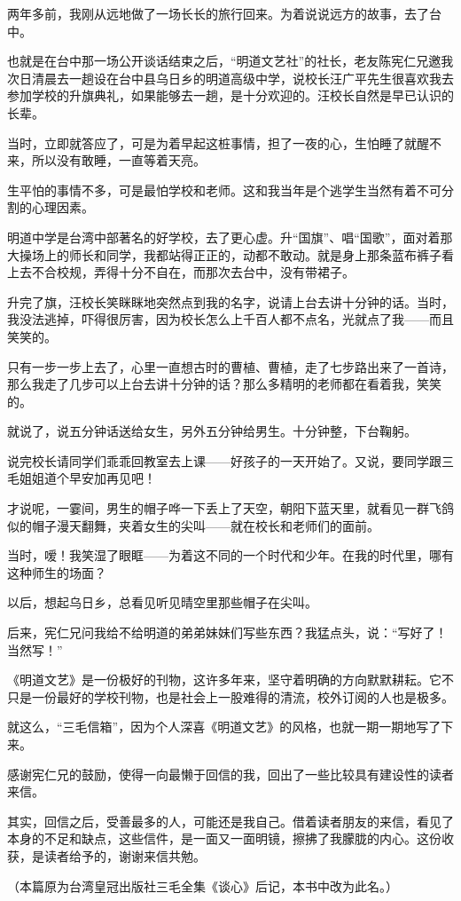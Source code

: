 \par 两年多前，我刚从远地做了一场长长的旅行回来。为着说说远方的故事，去了台中。
\par 也就是在台中那一场公开谈话结束之后，“明道文艺社”的社长，老友陈宪仁兄邀我次日清晨去一趟设在台中县乌日乡的明道高级中学，说校长汪广平先生很喜欢我去参加学校的升旗典礼，如果能够去一趟，是十分欢迎的。汪校长自然是早已认识的长辈。
\par 当时，立即就答应了，可是为着早起这桩事情，担了一夜的心，生怕睡了就醒不来，所以没有敢睡，一直等着天亮。
\par 生平怕的事情不多，可是最怕学校和老师。这和我当年是个逃学生当然有着不可分割的心理因素。
\par 明道中学是台湾中部著名的好学校，去了更心虚。升“国旗”、唱“国歌”，面对着那大操场上的师长和同学，我都站得正正的，动都不敢动。就是身上那条蓝布裤子看上去不合校规，弄得十分不自在，而那次去台中，没有带裙子。
\par 升完了旗，汪校长笑眯眯地突然点到我的名字，说请上台去讲十分钟的话。当时，我没法逃掉，吓得很厉害，因为校长怎么上千百人都不点名，光就点了我——而且笑笑的。
\par 只有一步一步上去了，心里一直想古时的曹植、曹植，走了七步路出来了一首诗，那么我走了几步可以上台去讲十分钟的话？那么多精明的老师都在看着我，笑笑的。
\par 就说了，说五分钟话送给女生，另外五分钟给男生。十分钟整，下台鞠躬。
\par 说完校长请同学们乖乖回教室去上课——好孩子的一天开始了。又说，要同学跟三毛姐姐道个早安加再见吧！
\par 才说呢，一霎间，男生的帽子哗一下丢上了天空，朝阳下蓝天里，就看见一群飞鸽似的帽子漫天翻舞，夹着女生的尖叫——就在校长和老师们的面前。
\par 当时，嗳！我笑湿了眼眶——为着这不同的一个时代和少年。在我的时代里，哪有这种师生的场面？
\par 以后，想起乌日乡，总看见听见晴空里那些帽子在尖叫。
\par 后来，宪仁兄问我给不给明道的弟弟妹妹们写些东西？我猛点头，说：“写好了！当然写！”
\par 《明道文艺》是一份极好的刊物，这许多年来，坚守着明确的方向默默耕耘。它不只是一份最好的学校刊物，也是社会上一股难得的清流，校外订阅的人也是极多。
\par 就这么，“三毛信箱”，因为个人深喜《明道文艺》的风格，也就一期一期地写了下来。
\par 感谢宪仁兄的鼓励，使得一向最懒于回信的我，回出了一些比较具有建设性的读者来信。
\par 其实，回信之后，受善最多的人，可能还是我自己。借着读者朋友的来信，看见了本身的不足和缺点，这些信件，是一面又一面明镜，擦拂了我朦胧的内心。这份收获，是读者给予的，谢谢来信共勉。
\par （本篇原为台湾皇冠出版社三毛全集《谈心》后记，本书中改为此名。）


